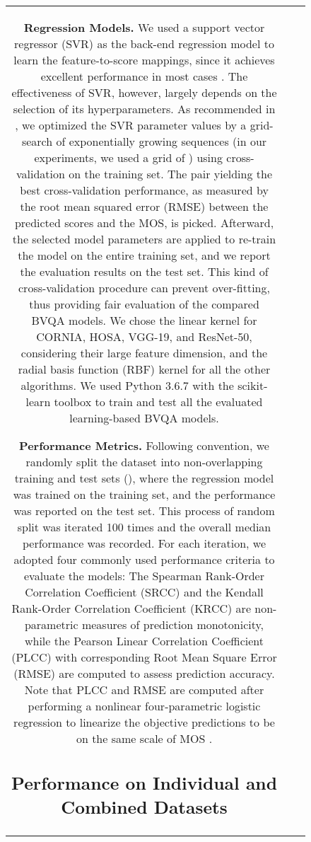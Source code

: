\documentclass[journal]{IEEEtran}
\begin{document}
\begin{figure}[!t]
\begin{tabular}{ccc}
\textbf{Regression Models.} We used a support vector regressor (SVR) as the back-end regression model to learn the feature-to-score mappings, since it achieves excellent performance in most cases \cite{korhonen2019two, saad2014blind, kim2017deep, ghadiyaram2017perceptual, mittal2012no, xu2014no}. The effectiveness of SVR, however, largely depends on the selection of its hyperparameters. As recommended in \cite{chang2011libsvm}, we optimized the SVR parameter values  by a grid-search of  exponentially growing sequences (in our experiments, we used a grid of  ) using cross-validation on the training set. The pair  yielding the best cross-validation performance, as measured by the root mean squared error (RMSE) between the predicted scores and the MOS, is picked. Afterward, the selected model parameters are applied to re-train the model on the entire training set, and we report the evaluation results on the test set. This kind of cross-validation procedure can prevent over-fitting, thus providing fair evaluation of the compared BVQA models. We chose the linear kernel for CORNIA, HOSA, VGG-19, and ResNet-50, considering their large feature dimension, and the radial basis function (RBF) kernel for all the other algorithms. We used Python 3.6.7 with the scikit-learn toolbox to train and test all the evaluated learning-based BVQA models.

\textbf{Performance Metrics.} Following convention, we randomly split the dataset into non-overlapping training and test sets (), where the regression model was trained on the training set, and the performance was reported on the test set. This process of random split was iterated 100 times and the overall median performance was recorded. For each iteration, we adopted four commonly used performance criteria to evaluate the models: The Spearman Rank-Order Correlation Coefficient (SRCC) and the Kendall Rank-Order Correlation Coefficient (KRCC) are non-parametric measures of prediction monotonicity, while the Pearson Linear Correlation Coefficient (PLCC) with corresponding Root Mean Square Error (RMSE) are computed to assess prediction accuracy. Note that PLCC and RMSE are computed after performing a nonlinear four-parametric logistic regression to linearize the objective predictions to be on the same scale of MOS \cite{seshadrinathan2010study}.

\subsection{Performance on Individual and Combined Datasets}
\label{ssec:performance_diff_datasets}


\end{tabular}
\end{figure}
\end{document}
